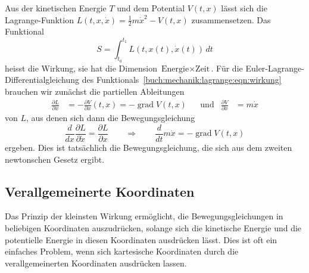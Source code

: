Aus der kinetischen Energie $T$ und dem Potential $V(t,x)$ lässt sich
%
die Lagrange-Funktion $L(t,x,\dot{x}) = \frac12m\dot{x}^2-V(t,x)$ 
zusammensetzen.
Das Funktional
\begin{equation}
S
=
\int_{t_0}^{t_1}
L(t,x(t),\dot{x}(t))
\,dt
\label{buch:mechanik:lagrange:eqn:wirkung}
\end{equation}
heisst die Wirkung, sie hat die Dimension $\text{Energie}\times\text{Zeit}$.
Für die Euler-Lagrange-Dif\-fe\-ren\-tialgleichung des
%
Funktionals~\eqref{buch:mechanik:lagrange:eqn:wirkung} brauchen wir
zunächst die partiellen Ableitungen
\begin{align*}
\frac{\partial L}{\partial x}
&=
-\frac{\partial V}{\partial x}(t,x)
=
-\operatorname{grad}V(t,x)
&&\text{und}&
\frac{\partial V}{\partial\dot{x}}
&=
m\dot{x}
\end{align*}
von $L$, aus denen sich dann die Bewegungsgleichung
\[
\frac{d}{dx}\frac{\partial L}{\partial\dot{x}}
=
\frac{\partial L}{\partial x}
\qquad\Rightarrow\qquad
\frac{d}{dt}m\dot{x}
=
-\operatorname{grad}V(t,x)
\]
ergeben. 
Dies ist tatsächlich die Bewegungsgleichung, die sich aus dem
zweiten newtonschen Gesetz ergibt.

%
%
\subsection{Verallgemeinerte Koordinaten
\label{buch:mechanik:lagrange:subsection:koordinaten}}
Das Prinzip der kleinsten Wirkung ermöglicht, die Bewegungsgleichungen
in beliebigen Koordinaten auszudrücken, solange sich die kinetische
Energie und die potentielle Energie in diesen Koordinaten ausdrücken
lässt.
Dies ist oft ein einfaches Problem, wenn sich kartesische Koordinaten
durch die verallgemeinerten Koordinaten ausdrücken lassen.

